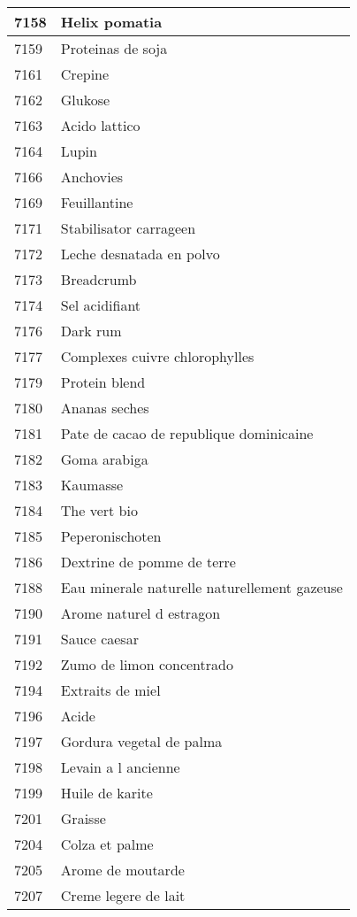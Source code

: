 \begin{longtable}{|l|l|}
7158 & Helix pomatia \\ \hline 
7159 & Proteinas de soja \\ \hline 
7161 & Crepine \\ \hline 
7162 & Glukose \\ \hline 
7163 & Acido lattico \\ \hline 
7164 & Lupin \\ \hline 
7166 & Anchovies \\ \hline 
7169 & Feuillantine \\ \hline 
7171 & Stabilisator carrageen \\ \hline 
7172 & Leche desnatada en polvo \\ \hline 
7173 & Breadcrumb \\ \hline 
7174 & Sel acidifiant \\ \hline 
7176 & Dark rum \\ \hline 
7177 & Complexes cuivre chlorophylles \\ \hline 
7179 & Protein blend \\ \hline 
7180 & Ananas seches \\ \hline 
7181 & Pate de cacao de republique dominicaine \\ \hline 
7182 & Goma arabiga \\ \hline 
7183 & Kaumasse \\ \hline 
7184 & The vert bio \\ \hline 
7185 & Peperonischoten \\ \hline 
7186 & Dextrine de pomme de terre \\ \hline 
7188 & Eau minerale naturelle naturellement gazeuse \\ \hline 
7190 & Arome naturel d estragon \\ \hline 
7191 & Sauce caesar \\ \hline 
7192 & Zumo de limon concentrado \\ \hline 
7194 & Extraits de miel \\ \hline 
7196 & Acide \\ \hline 
7197 & Gordura vegetal de palma \\ \hline 
7198 & Levain a l ancienne \\ \hline 
7199 & Huile de karite \\ \hline 
7201 & Graisse \\ \hline 
7204 & Colza et palme \\ \hline 
7205 & Arome de moutarde \\ \hline 
7207 & Creme legere de lait \\ \hline 

\end{longtable}
